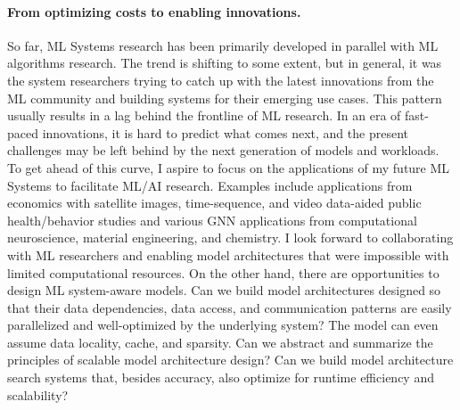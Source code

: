 \documentclass[letterpaper]{article}
\begin{document}
\paragraph{From optimizing costs to enabling innovations.}So far, ML Systems research has been primarily developed in parallel with ML algorithms research. The trend is shifting to some extent, but in general, it was the system researchers trying to catch up with the latest innovations from the ML community and building systems for their emerging use cases. This pattern usually results in a lag behind the frontline of ML research. In an era of fast-paced innovations, it is hard to predict what comes next, and the present challenges may be left behind by the next generation of models and workloads. To get ahead of this curve, I aspire to focus on the applications of my future ML Systems to facilitate ML/AI research. Examples include applications from economics with satellite images, time-sequence, and video data-aided public health/behavior studies and various GNN applications from computational neuroscience, material engineering, and chemistry. I look forward to collaborating with ML researchers and enabling model architectures that were impossible with limited computational resources. On the other hand, there are opportunities to design ML system-aware models. Can we build model architectures designed so that their data dependencies, data access, and communication patterns are easily parallelized and well-optimized by the underlying system? The model can even assume data locality, cache, and sparsity. Can we abstract and summarize the principles of scalable model architecture design? Can we build model architecture search systems that, besides accuracy, also optimize for runtime efficiency and scalability?







\vspace{-2mm}


\end{document}
